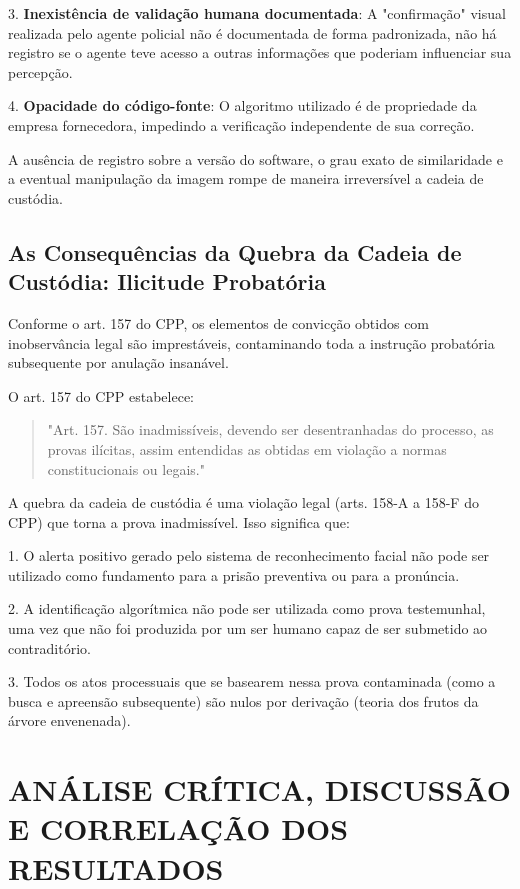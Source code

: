 \documentclass[12pt,a4paper]{article}
\begin{document}
3. \textbf{Inexistência de validação humana documentada}: A "confirmação" visual realizada pelo agente policial não é documentada de forma padronizada, não há registro se o agente teve acesso a outras informações que poderiam influenciar sua percepção.

4. \textbf{Opacidade do código-fonte}: O algoritmo utilizado é de propriedade da empresa fornecedora, impedindo a verificação independente de sua correção.

A ausência de registro sobre a versão do software, o grau exato de similaridade e a eventual manipulação da imagem rompe de maneira irreversível a cadeia de custódia.

\subsection{As Consequências da Quebra da Cadeia de Custódia: Ilicitude Probatória}

Conforme o art. 157 do CPP, os elementos de convicção obtidos com inobservância legal são imprestáveis, contaminando toda a instrução probatória subsequente por anulação insanável.

O art. 157 do CPP estabelece:

\begin{quote}
"Art. 157. São inadmissíveis, devendo ser desentranhadas do processo, as provas ilícitas, assim entendidas as obtidas em violação a normas constitucionais ou legais."
\end{quote}

A quebra da cadeia de custódia é uma violação legal (arts. 158-A a 158-F do CPP) que torna a prova inadmissível. Isso significa que:

1. O alerta positivo gerado pelo sistema de reconhecimento facial não pode ser utilizado como fundamento para a prisão preventiva ou para a pronúncia.

2. A identificação algorítmica não pode ser utilizada como prova testemunhal, uma vez que não foi produzida por um ser humano capaz de ser submetido ao contraditório.

3. Todos os atos processuais que se basearem nessa prova contaminada (como a busca e apreensão subsequente) são nulos por derivação (teoria dos frutos da árvore envenenada).

\section{ANÁLISE CRÍTICA, DISCUSSÃO E CORRELAÇÃO DOS RESULTADOS}
\end{document}
